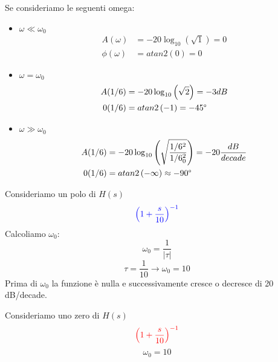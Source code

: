 \documentclass[a4paper]{article}
\begin{document}
\vspace{1em}
\noindent
Se consideriamo le seguenti omega:
\begin{itemize}
  \item \( \omega \ll \omega_0 \)
    \[
      \begin{aligned}
        A(\omega) &= -20 \log_{10} \left( \sqrt{1} \right) = 0\\
        \phi(\omega) &= atan2\left( 0 \right) = 0
      \end{aligned}
    \] 
    \item \( \omega = \omega_0 \) 
      \[
        \begin{aligned}
          A(1/6) &= -20 \log_{10} \left( \sqrt{2} \right) = -3dB\\
          0(1/6) &= atan2\left( -1 \right) = -45\degree
        \end{aligned}
      \] 

    \item \( \omega \gg \omega_0 \) 
      \[
        \begin{aligned}
          A(1/6) &= -20 \log_{10} \left( \sqrt{\frac{1/6^2}{1/6_0^2}} \right) =
          -20 \frac{dB}{decade}\\
          0(1/6) &= atan2\left( -\infty \right) \approx -90\degree
        \end{aligned}
      \]
\end{itemize}
Consideriamo un polo di \( H(s) \) 
\[
  \color{blue} \left( 1 + \frac{s}{10} \right)^{-1}
\] 
Calcoliamo \( \omega_0 \):
\[
  \omega_0 = \frac{1}{|\tau|}
\] 
\[
  \tau = \frac{1}{10} \to \omega_0 = 10
\] 
Prima di \( \omega_0 \) la funzione è nulla e successivamente cresce o decresce di
20 dB/decade.
\label{09-12-D6}

Consideriamo uno zero di \( H(s) \) 
\[
  \color{red} \left( 1 + \frac{s}{10} \right)^{-1}
\] 
\[
\omega_0 = 10
\] 
\label{09-12-D7}
\end{document}
